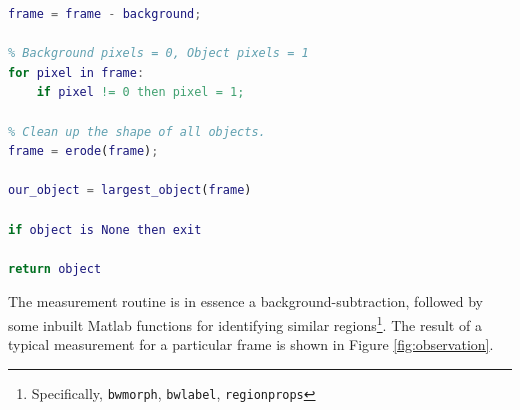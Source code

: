 \begin{lstlisting}[language=Matlab, label=lst:obs,
caption=Implementation of observation routine.]
% Subtract background from frame
frame = frame - background;

% Background pixels = 0, Object pixels = 1
for pixel in frame:
    if pixel != 0 then pixel = 1;

% Clean up the shape of all objects.
frame = erode(frame);

our_object = largest_object(frame)

if object is None then exit

return object
\end{lstlisting}

The measurement routine is in essence a background-subtraction, followed by some
inbuilt Matlab functions for identifying similar regions\footnote{Specifically,
\texttt{bwmorph}, \texttt{bwlabel}, \texttt{regionprops}}. The result of a
typical measurement for a particular frame is shown in Figure \ref{fig:observation}.

